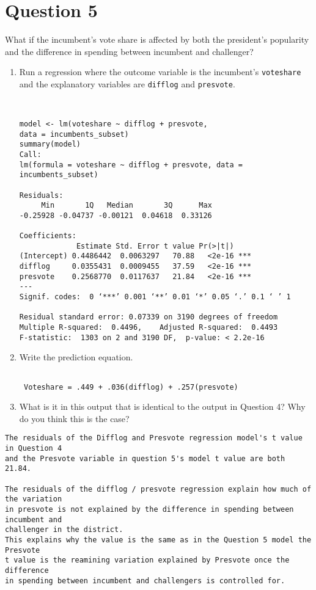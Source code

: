 \documentclass[12pt,letterpaper]{article}
\begin{document}
\section*{Question 5}
\noindent What if the incumbent's vote share is affected by both the president's popularity and the difference in spending between incumbent and challenger? 
	\begin{enumerate}
		\item Run a regression where the outcome variable is the incumbent's \texttt{voteshare} and the explanatory variables are \texttt{difflog} and \texttt{presvote}.	
  
\begin{verbatim}
      
  
model <- lm(voteshare ~ difflog + presvote, 
data = incumbents_subset)
summary(model)
Call:
lm(formula = voteshare ~ difflog + presvote, data = incumbents_subset)

Residuals:
     Min       1Q   Median       3Q      Max 
-0.25928 -0.04737 -0.00121  0.04618  0.33126 

Coefficients:
             Estimate Std. Error t value Pr(>|t|)    
(Intercept) 0.4486442  0.0063297   70.88   <2e-16 ***
difflog     0.0355431  0.0009455   37.59   <2e-16 ***
presvote    0.2568770  0.0117637   21.84   <2e-16 ***
---
Signif. codes:  0 ‘***’ 0.001 ‘**’ 0.01 ‘*’ 0.05 ‘.’ 0.1 ‘ ’ 1

Residual standard error: 0.07339 on 3190 degrees of freedom
Multiple R-squared:  0.4496,	Adjusted R-squared:  0.4493 
F-statistic:  1303 on 2 and 3190 DF,  p-value: < 2.2e-16

\end{verbatim}
		\item Write the prediction equation.	
  
\begin{verbatim}

 Voteshare = .449 + .036(difflog) + .257(presvote)    
\end{verbatim} 

		\item What is it in this output that is identical to the output in Question 4? Why do you think this is the case?
	\end{enumerate}

\begin{verbatim}
The residuals of the Difflog and Presvote regression model's t value in Question 4 
and the Presvote variable in question 5's model t value are both 21.84.

The residuals of the difflog / presvote regression explain how much of the variation 
in presvote is not explained by the difference in spending between incumbent and 
challenger in the district.
This explains why the value is the same as in the Question 5 model the Presvote 
t value is the reamining variation explained by Presvote once the difference 
in spending between incumbent and challengers is controlled for.


\end{verbatim}
\end{document}
